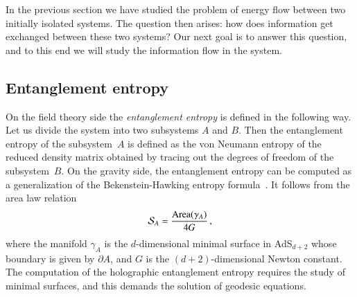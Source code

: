 \documentclass[epj]{webofc}
\begin{document}
In the previous section we have studied the problem of energy flow between two initially isolated systems. The question then arises: how does information get exchanged between these two systems? Our next goal is to answer this question, and to this end we will study the information flow in the system.



\subsection{Entanglement entropy}
\label{subsec:Entanglement_Entropy}


On the field theory side the {\it entanglement entropy} is defined in the following way. Let us divide the system into two subsystems $A$ and $B$. Then the entanglement entropy of the subsystem~$A$ is defined as the von Neumann entropy of the reduced density matrix obtained by tracing out the degrees of freedom of the subsystem~$B$. On the gravity side, the entanglement entropy can be computed as a generalization of the Bekenstein-Hawking entropy formula~\cite{Ryu:2006bv,Ryu:2006ef,Hubeny:2007xt}. It follows from the area law relation
\begin{equation}
{\cal S}_A = \frac{\textrm{Area}(\gamma_A)}{4 G} \,,
\end{equation}
where the manifold $\gamma_A$ is the $d$-dimensional minimal surface in AdS$_{d+2}$ whose boundary is given by $\partial A$, and $G$ is the $(d+2)$-dimensional Newton constant. The computation of the holographic entanglement entropy requires the study of minimal surfaces, and this demands the solution of geodesic equations. 
\end{document}

